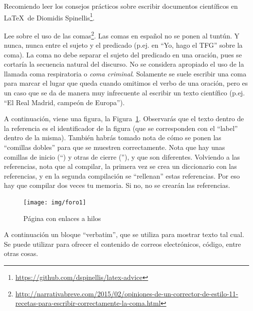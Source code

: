\documentclass[a4paper, 12pt]{book}
\begin{document}
Recomiendo leer los consejos prácticos sobre escribir documentos científicos en \LaTeX \ de Diomidis Spinellis\footnote{\url{https://github.com/dspinellis/latex-advice}}.

Lee sobre el uso de las comas\footnote{\url{http://narrativabreve.com/2015/02/opiniones-de-un-corrector-de-estilo-11-recetas-para-escribir-correctamente-la-coma.html}}. 
Las comas en español no se ponen al tuntún.
Y nunca, nunca entre el sujeto y el predicado (p.ej. en ``Yo, hago el TFG'' sobre la coma).
La coma no debe separar el sujeto del predicado en una oración, pues se cortaría la secuencia natural del discurso.
No se considera apropiado el uso de la llamada coma respiratoria o \emph{coma criminal}.
Solamente se suele escribir una coma para marcar el lugar que queda cuando omitimos el verbo de una oración, pero es un caso que se da de manera muy infrecuente al escribir un texto científico (p.ej. ``El Real Madrid, campeón de Europa'').

A continuación, viene una figura, la Figura~\ref{figura:foro_hilos}. 
Observarás que el texto dentro de la referencia es el identificador de la figura (que se corresponden con el ``label'' dentro de la misma). 
También habrás tomado nota de cómo se ponen las ``comillas dobles'' para que se muestren correctamente. 
Nota que hay unas comillas de inicio (``) y otras de cierre (''), y que son diferentes.
Volviendo a las referencias, nota que al compilar, la primera vez se crea un diccionario con las referencias, y en la segunda compilación se ``rellenan'' estas referencias. 
Por eso hay que compilar dos veces tu memoria.
Si no, no se crearán las referencias.

 \begin{figure}
    \centering
    \texttt{[image: img/foro1]}
    \caption{Página con enlaces a hilos}
    \label{figura:foro_hilos}
 \end{figure}

A continuación un bloque ``verbatim'', que se utiliza para mostrar texto tal cual.
Se puede utilizar para ofrecer el contenido de correos electrónicos, código, entre otras cosas.
\end{document}
